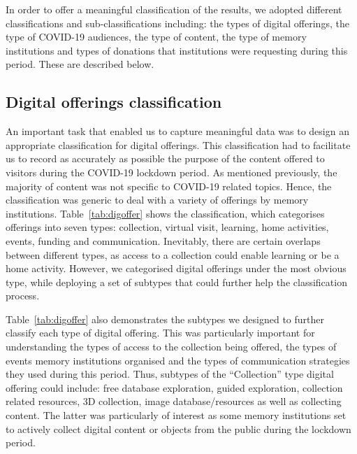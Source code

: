 \documentclass{egpubl}
\begin{document}
In order to offer a meaningful classification of the results, we adopted different classifications and sub-classifications including: the types of digital offerings, the type of COVID-19 audiences, the type of content, the type of memory institutions and types of donations that institutions were requesting during this period. These are described below.

\subsection{Digital offerings classification}
\label{off}
An important task that enabled us to capture meaningful data was to design an appropriate classification for digital offerings. This classification had to facilitate us to record as accurately as possible the purpose of the content offered to visitors during the COVID-19 lockdown period. As mentioned previously, the majority of content was not specific to COVID-19 related topics. Hence, the classification was generic to deal with a variety of offerings by memory institutions. Table~\ref{tab:digoffer} shows the classification, which categorises offerings into seven types: collection, virtual visit, learning, home activities, events, funding and communication. Inevitably, there are certain overlaps between different types, as access to a collection could enable learning or be a home activity. However, we categorised digital offerings %
under the most obvious type, while deploying a set of subtypes that could further help the classification process.

Table~\ref{tab:digoffer} also demonstrates the subtypes we designed to further classify each type of digital offering. This was particularly important for understanding the types of access to the collection being offered, the types of events memory institutions organised and the types of communication strategies they used during this period. Thus, subtypes of the ``Collection'' type digital offering could include: free database exploration, guided exploration, collection related resources, 3D collection, image database/resources as well as collecting content. The latter was particularly of interest as some memory institutions set to actively collect digital content or objects from the public during the lockdown period.
\end{document}
